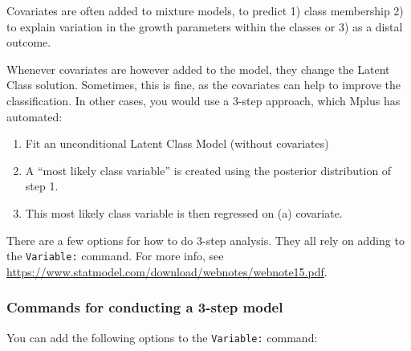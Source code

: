 \documentclass[
]{book}
\providecommand{\tightlist}{%
  \setlength{\itemsep}{0pt}\setlength{\parskip}{0pt}}
\begin{document}
Covariates are often added to mixture models, to predict 1) class membership 2) to explain variation in the growth parameters within the classes or 3) as a distal outcome.

Whenever covariates are however added to the model, they change the Latent Class solution. Sometimes, this is fine, as the covariates can help to improve the classification. In other cases, you would use a 3-step approach, which Mplus has automated:

\begin{enumerate}
\def\labelenumi{\arabic{enumi}.}
\tightlist
\item
  Fit an unconditional Latent Class Model (without covariates)
\item
  A ``most likely class variable'' is created using the posterior distribution of step 1.
\item
  This most likely class variable is then regressed on (a) covariate.
\end{enumerate}

There are a few options for how to do 3-step analysis. They all rely on adding to the \texttt{Variable:} command.
For more info, see \url{https://www.statmodel.com/download/webnotes/webnote15.pdf}.

\hypertarget{commands-for-conducting-a-3-step-model}{%
\subsubsection{Commands for conducting a 3-step model}\label{commands-for-conducting-a-3-step-model}}

You can add the following options to the \texttt{Variable:} command:
\end{document}
